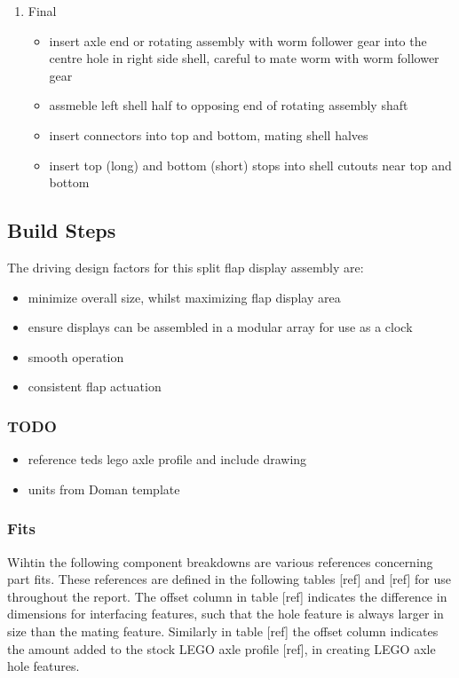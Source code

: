 \documentclass[11pt]{article}
\begin{document}
\begin{enumerate}
\item Final
\label{sec:org7107c7f}
\begin{itemize}
\item insert axle end or rotating assembly with worm follower gear into the centre hole in right side shell, careful to mate worm with worm follower gear
\item assmeble left shell half to opposing end of rotating assembly shaft
\item insert connectors into top and bottom, mating shell halves
\item insert top (long) and bottom (short) stops into shell cutouts near top and bottom
\end{itemize}
\end{enumerate}

\subsection{Build Steps}
\label{sec:org8b082a0}
The driving design factors for this split flap display assembly are:
\begin{itemize}
\item minimize overall size, whilst maximizing flap display area
\item ensure displays can be assembled in a modular array for use as a clock
\item smooth operation
\item consistent flap actuation
\end{itemize}

\subsubsection{TODO}
\label{sec:org2cd26be}
\begin{itemize}
\item reference teds lego axle profile and include drawing
\item units from Doman template
\end{itemize}

\subsubsection{Fits}
\label{sec:orgd54c268}
Wihtin the following component breakdowns are various references concerning part fits. These references are defined in the following tables [ref] and [ref] for use throughout the report. The offset column in table [ref] indicates the difference in dimensions for interfacing features, such that the hole feature is always larger in size than the mating feature. Similarly in table [ref] the offset column indicates the amount added to the stock LEGO axle profile [ref], in creating LEGO axle hole features. 
\end{document}
